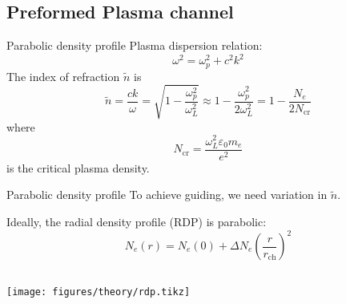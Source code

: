 \documentclass[dvipsnames]{beamer}
\begin{document}
\subsection[]{Preformed Plasma channel}
\begin{frame}{Parabolic density profile}
 Plasma dispersion relation:
 \begin{equation*}
\omega^2=\omega_p^2+c^2k^2
 \end{equation*}
 The index of refraction $\tilde n$ is
 \begin{equation*}
\tilde{n}=\frac{c k}{\omega}=\sqrt{1-\frac{\omega_p^2}{\omega_L^2}}\approx1-\frac{\omega_p^2}{2\omega_L^2}=1-\frac{N_e}{2N_\text{cr}}
 \end{equation*}
 {\small where
\begin{equation*}
 N_\text{cr}=\frac{\omega_L^2\varepsilon_0 m_e}{e^2}
\end{equation*}
is the critical plasma density.}
\end{frame}
\begin{frame}{Parabolic density profile}
To achieve guiding, we need variation in $\tilde{n}$.

Ideally, the radial density profile (RDP) is parabolic:
\begin{equation*}
N_e(r)=N_e(0)+\Delta N_e\left( \frac{r}{r_\text{ch}}\right)^2
\end{equation*}
 \begin{columns}
\texttt{[image: figures/theory/rdp.tikz]}

 \end{columns}
\end{frame}
\end{document}
